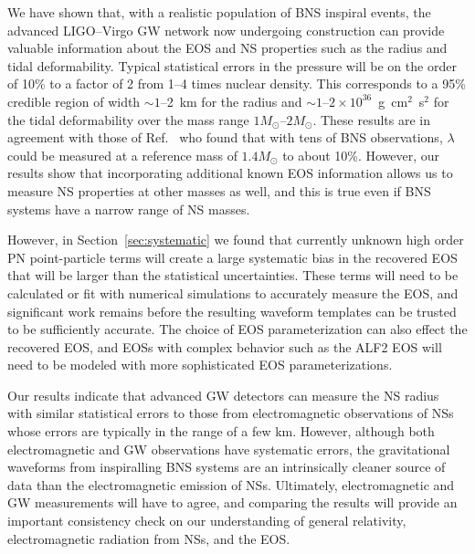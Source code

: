 \documentclass[twocolumn,prd,amssymb,aps,nofootinbib,showpacs,epsf]{revtex4}
\begin{document}
We have shown that, with a realistic population of BNS inspiral events, the advanced LIGO--Virgo GW network now undergoing construction can provide valuable information about the EOS and NS properties such as the radius and tidal deformability. Typical statistical errors in the pressure will be on the order of 10\% to a factor of 2 from 1--4 times nuclear density. This corresponds to a 95\% credible region of width $\sim 1$--2~km for the radius and $\sim 1$--$2\times 10^{36}$~g~cm$^2$~s$^2$ for the tidal deformability over the mass range $1M_\odot$--$2M_\odot$. These results are in agreement with those of Ref.~\cite{DelPozzoLiAgathos2013} who found that with tens of BNS observations, $\lambda$ could be measured at a reference mass of $1.4M_\odot$ to about 10\%. However, our results show that incorporating additional known EOS information allows us to measure NS properties at other masses as well, and this is true even if BNS systems have a narrow range of NS masses.

However, in Section~\ref{sec:systematic} we found that currently unknown high order PN point-particle terms will create a large systematic bias in the recovered EOS that will be larger than the statistical uncertainties. These terms will need to be calculated or fit with numerical simulations to accurately measure the EOS, and significant work remains before the resulting waveform templates can be trusted to be sufficiently accurate. The choice of EOS parameterization can also effect the recovered EOS, and EOSs with complex behavior such as the ALF2 EOS will need to be modeled with more sophisticated EOS parameterizations. 


Our results indicate that advanced GW detectors can measure the NS radius with similar statistical errors to those from electromagnetic observations of NSs whose errors are typically in the range of a few km. However, although both electromagnetic and GW observations have systematic errors, the gravitational waveforms from inspiralling BNS systems are an intrinsically cleaner source of data than the electromagnetic emission of NSs. Ultimately, electromagnetic and GW measurements will have to agree, and comparing the results will provide an important consistency check on our understanding of general relativity, electromagnetic radiation from NSs, and the EOS.
 
\end{document}
